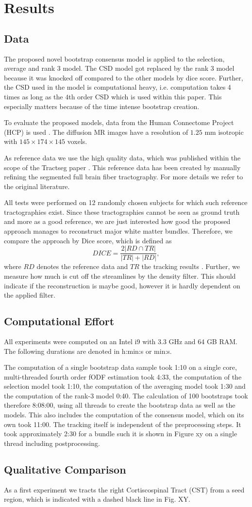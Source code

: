 \section{Results}
\subsection{Data}
The proposed novel bootstrap consensus model is applied to the selection,
average and rank $3$ model. The CSD model got replaced by the rank $3$ model
because it was knocked off compared to the other models by dice score. Further,
the CSD used in the model is computational heavy, i.e. computation takes 4 times as long
as the $4$th order CSD which is used within this paper. This especially matters
because of the time intense bootstrap creation. 

To evaluate the proposed models, data from the Human
Connectome Project (HCP) is used \cite{HCP}. The diffusion MR images have a resolution of $1.25$ mm
isotropic with $145 \times 174 \times 145$ voxels. 

As reference data we use the high quality data, which was published within the
scope of the Tractseg paper \cite{WASSERTHAL2018239}. This reference data has been
created by manually refining the segmented full brain fiber tractography. For
more details we refer to the original literature.

All tests were performed on 12 randomly chosen subjects for which such reference tractographies
exist. Since these tractographies cannot be seen as ground truth and more as a
good reference, we are just interested how good the proposed approach manages to
reconstruct major white matter bundles. Therefore, we compare the approach by
Dice score, which is defined as
\[ 
	DICE = \frac{2 |RD \cap TR |}{|TR| + |RD|} ,
\]
where $RD$ denotes the reference data and $TR$ the tracking results
\cite{SCHILLING2019194}. 
Further, we measure how much is cut off the streamlines by the density filter.
This should indicate if the reconstruction is maybe good, however it is hardly
dependent on the applied filter. 

\subsection{Computational Effort}
All experiments were computed on an Intel i9 with 3.3 GHz and 64 GB RAM. The
following durations are denoted in h:min:s or min:s.

The computation of a single bootstrap data sample took 1:10 on a single core,
multi-threaded fourth order fODF estimation took 4:33, the computation of the
selection model took 1:10, the computation of the averaging model took 1:30 and
the computation of the rank-3 model 0:40. The calculation of 100 bootstraps took
therefore 8:08:00, using all threads to create the bootstrap data as well as the
models. This also includes the computation of the consensus model, which on its
own took 11:00. The tracking itself is independent of the preprocessing steps.
It took approximately 2:30 for a bundle such it is shown in Figure xy on a
single thread including postprocessing.  

\subsection{Qualitative Comparison}
As a first experiment we tracts the right Cortiscospinal Tract (CST) from a seed
region, which is indicated with a dashed black line in Fig. XY. 
